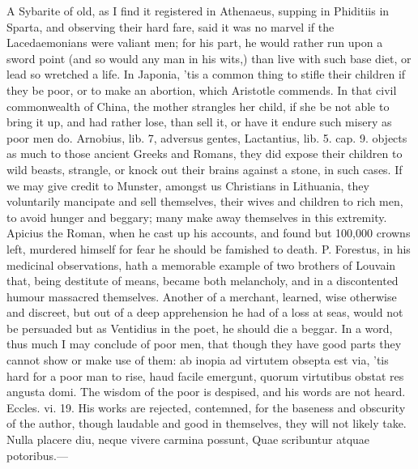 {A Sybarite of old, as I find it registered in Athenaeus, supping
in Phiditiis in Sparta, and observing their hard fare, said it was no
marvel if the Lacedaemonians were valiant men; for his part, he would
rather run upon a sword point (and so would any man in his wits,) than
live with such base diet, or lead so wretched a life. In Japonia,
'tis a common thing to stifle their children if they be poor, or to
make an abortion, which Aristotle commends. In that civil commonwealth
of China, the mother strangles her child, if she be not able to
bring it up, and had rather lose, than sell it, or have it endure such
misery as poor men do. Arnobius, lib. 7, adversus gentes,
Lactantius, lib. 5. cap. 9. objects as much to those ancient
Greeks and Romans, they did expose their children to wild beasts,
strangle, or knock out their brains against a stone, in such cases. If
we may give credit to Munster, amongst us Christians in
Lithuania, they voluntarily mancipate and sell themselves, their wives
and children to rich men, to avoid hunger and beggary;  many make
away themselves in this extremity. Apicius the Roman, when he cast up
his accounts, and found but 100,000 crowns left, murdered himself for
fear he should be famished to death. P. Forestus, in his medicinal
observations, hath a memorable example of two brothers of Louvain that,
being destitute of means, became both melancholy, and in a discontented
humour massacred themselves. Another of a merchant, learned, wise
otherwise and discreet, but out of a deep apprehension he had of a loss
at seas, would not be persuaded but as Ventidius in the poet, he
should die a beggar. In a word, thus much I may conclude of poor men,
that though they have good parts they cannot show or make use of
them: ab inopia ad virtutem obsepta est via, 'tis hard for a poor
man to  rise, haud facile emergunt, quorum virtutibus obstat res
angusta domi. The wisdom of the poor is despised, and his words
are not heard. Eccles. vi. 19. His works are rejected, contemned, for
the baseness and obscurity of the author, though laudable and good in
themselves, they will not likely take.
Nulla placere diu, neque vivere carmina possunt,
Quae scribuntur atquae potoribus.---

}
